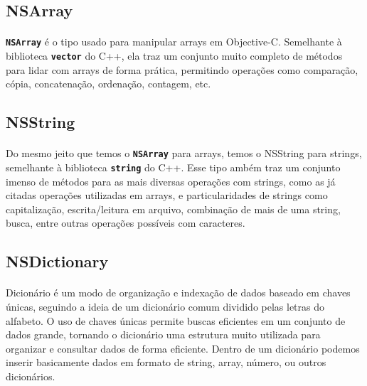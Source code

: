\documentclass[a4paper,12pt,brazil,doubleside]{book}
\begin{document}
\bigskip

\subsection{NSArray}

\paragraph{}\texttt{\textbf{NSArray}} é o tipo usado para manipular arrays em Objective-C. Semelhante à biblioteca \texttt{\textbf{vector}} do C++, ela traz um conjunto muito completo de métodos para lidar com arrays de forma prática, permitindo operações como comparação, cópia, concatenação, ordenação, contagem, etc.

\bigskip

\subsection{NSString}

\paragraph{}Do mesmo jeito que temos o \texttt{\textbf{NSArray}} para arrays, temos o NSString para strings, semelhante à biblioteca \texttt{\textbf{string}} do C++. Esse tipo ambém traz um conjunto imenso de métodos para as mais diversas operações com strings, como as já citadas operações utilizadas em arrays, e particularidades de strings como capitalização, escrita/leitura em arquivo, combinação de mais de uma string, busca, entre outras operações possíveis com caracteres.

\bigskip

\subsection{NSDictionary}

\paragraph{}Dicionário é um modo de organização e indexação de dados baseado em chaves únicas, seguindo a ideia de um dicionário comum dividido pelas letras do alfabeto. O uso de chaves únicas permite buscas eficientes em um conjunto de dados grande, tornando o dicionário uma estrutura muito utilizada para organizar e consultar dados de forma eficiente. Dentro de um dicionário podemos inserir basicamente dados em formato de string, array, número, ou outros dicionários.
\end{document}
